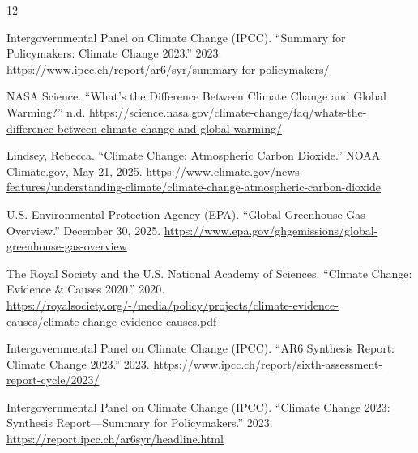 \documentclass[12pt]{article}
\begin{document}
\begin{thebibliography}{12}

Intergovernmental Panel on Climate Change (IPCC).
``Summary for Policymakers: Climate Change 2023.''
2023.
\url{https://www.ipcc.ch/report/ar6/syr/summary-for-policymakers/}

NASA Science.
``What's the Difference Between Climate Change and Global Warming?''
n.d.
\url{https://science.nasa.gov/climate-change/faq/whats-the-difference-between-climate-change-and-global-warming/}

Lindsey, Rebecca.
``Climate Change: Atmospheric Carbon Dioxide.''
NOAA Climate.gov, May 21, 2025.
\url{https://www.climate.gov/news-features/understanding-climate/climate-change-atmospheric-carbon-dioxide}

U.S. Environmental Protection Agency (EPA).
``Global Greenhouse Gas Overview.''
December 30, 2025.
\url{https://www.epa.gov/ghgemissions/global-greenhouse-gas-overview}

The Royal Society and the U.S. National Academy of Sciences.
``Climate Change: Evidence \& Causes 2020.''
2020.
\url{https://royalsociety.org/-/media/policy/projects/climate-evidence-causes/climate-change-evidence-causes.pdf}

Intergovernmental Panel on Climate Change (IPCC).
``AR6 Synthesis Report: Climate Change 2023.''
2023.
\url{https://www.ipcc.ch/report/sixth-assessment-report-cycle/2023/}

Intergovernmental Panel on Climate Change (IPCC).
``Climate Change 2023: Synthesis Report---Summary for Policymakers.''
2023.
\url{https://report.ipcc.ch/ar6syr/headline.html}

\end{thebibliography}
\end{document}
